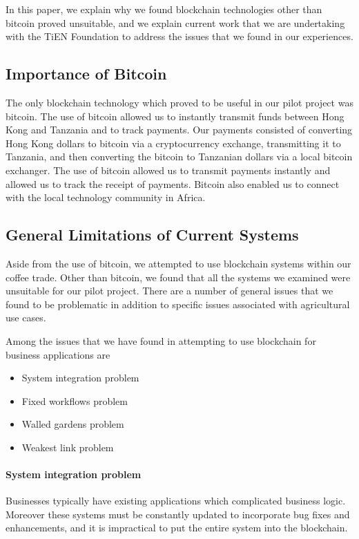 \documentclass[journal]{IEEEtran}
\begin{document}
In this paper, we explain why we found blockchain technologies other
than bitcoin proved unsuitable, and we explain current work that we
are undertaking with the TiEN Foundation to address the issues that we
found in our experiences.

\subsection{Importance of Bitcoin}
The only blockchain technology which proved to be useful in our pilot
project was bitcoin.  The use of bitcoin allowed us to instantly
transmit funds between Hong Kong and Tanzania and to track payments.
Our payments consisted of converting Hong Kong dollars to bitcoin via
a cryptocurrency exchange, transmitting it to Tanzania, and then
converting the bitcoin to Tanzanian dollars via a local bitcoin
exchanger.  The use of bitcoin allowed us to transmit payments
instantly and allowed us to track the receipt of payments.  Bitcoin
also enabled us to connect with the local technology community in
Africa.

\subsection{General Limitations of Current Systems}
Aside from the use of bitcoin, we attempted to use blockchain systems
within our coffee trade.  Other than bitcoin, we found that all the
systems we examined were unsuitable for our pilot project. There are a
number of general issues that we found to be problematic in addition
to specific issues associated with agricultural use cases.

Among the issues that we have found in attempting to use blockchain
for business applications are
\begin{itemize}
 \item System integration problem
 \item Fixed workflows problem
 \item Walled gardens problem
 \item Weakest link problem
\end{itemize}

\paragraph {System integration problem} Businesses typically have existing
applications which complicated business logic.  Moreover these systems
must be constantly updated to incorporate bug fixes and enhancements,
and it is impractical to put the entire system into the blockchain.
\end{document}

